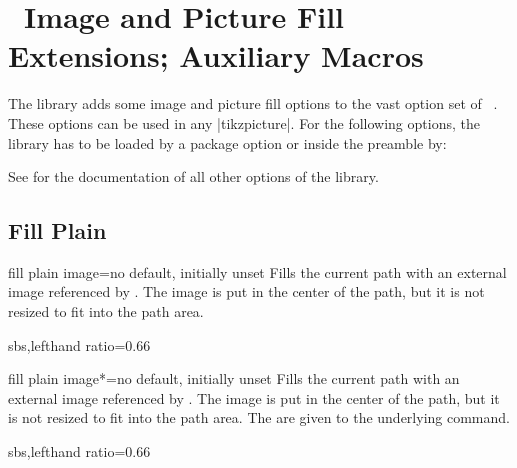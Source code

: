 \clearpage
\section{\tikzname\ Image and Picture Fill Extensions; Auxiliary Macros}\label{sec:tikzimagefilling}%
%
The  library adds some image and picture fill options to the vast option set of
\tikzname\ \cite{tantau:tikz_and_pgf}. These options can be used in any |tikzpicture|.
For the following options, the  library has to be loaded
by a package option or inside the preamble by:
\begin{dispListing}
\end{dispListing}

See  for the documentation of all other options of the  library.

\subsection{Fill Plain}
\begin{docTikzKey}{fill plain image}{=}{no default, initially unset}
  Fills the current path with an external image referenced by .
  The image is put in the center of the path, but it is not resized to fit into
  the path area.
\begin{dispExample*}{sbs,lefthand ratio=0.66}
\end{dispExample*}
\end{docTikzKey}


\begin{docTikzKey}{fill plain image*}{=}{no default, initially unset}
  Fills the current path with an external image referenced by .
  The image is put in the center of the path, but it is not resized to fit into
  the path area.
  The  are given to the underlying  command.
\begin{dispExample*}{sbs,lefthand ratio=0.66}
\end{dispExample*}
\end{docTikzKey}


